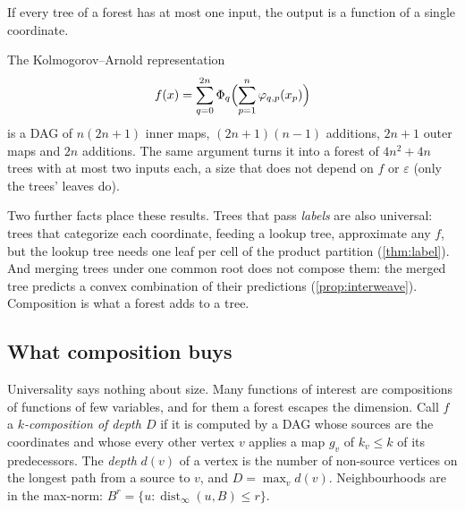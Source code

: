 \begin{proposition}\label{prop:fanin-main}
If every tree of a forest has at most one input, the output is a function of a single
coordinate.
\end{proposition}

\begin{remark}\label{rem:ka-main}
The Kolmogorov--Arnold representation
\begin{equation}\label{eq:ka}
  f(x)=\sum_{q=0}^{2n}\Phi_q\Bigl(\sum_{p=1}^n\varphi_{q,p}(x_p)\Bigr)
\end{equation}
is a DAG of
$n(2n+1)$ inner maps, $(2n+1)(n-1)$ additions, $2n+1$ outer maps and $2n$ additions.  The
same argument turns it into a forest of $4n^2+4n$ trees with at most two inputs each, a
size that does not depend on $f$ or $\varepsilon$ (only the trees' leaves do).
\end{remark}

Two further facts place these results.  Trees that pass \emph{labels} are also universal:
trees that categorize each coordinate, feeding a lookup tree, approximate any $f$, but the
lookup tree needs one leaf per cell of the product partition (\cref{thm:label}).  And
merging trees under one common root does not compose them: the merged tree predicts a
convex combination of their predictions (\cref{prop:interweave}).  Composition is what a
forest adds to a tree.

\subsection{What composition buys}

Universality says nothing about size.  Many functions of interest are compositions of
functions of few variables, and for them a forest escapes the dimension.  Call $f$ a
\emph{$k$-composition of depth $D$} if it is computed by a DAG whose sources are the
coordinates and whose every other vertex $v$ applies a map $g_v$ of $k_v\le k$ of its
predecessors.  The \emph{depth} $d(v)$ of a vertex is the number of non-source vertices on the
longest path from a source to $v$, and $D=\max_vd(v)$.  Neighbourhoods are in the max-norm:
$B^{r}=\{u:\operatorname{dist}_\infty(u,B)\le r\}$.

